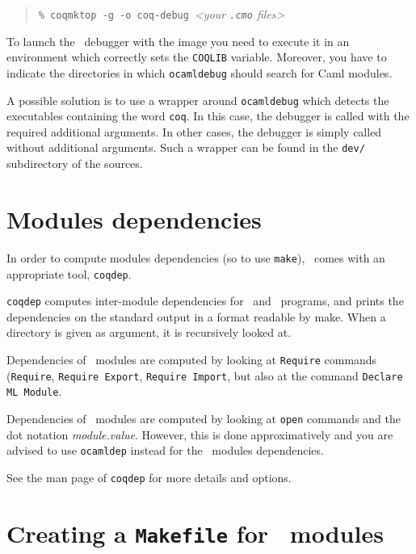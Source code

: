\begin{quotation}
\texttt{\% coqmktop -g -o coq-debug}~\emph{<your \texttt{.cmo} files>}
\end{quotation}


To launch the \ocaml\ debugger with the image you need to execute it in
an environment which correctly sets the \texttt{COQLIB} variable.
Moreover, you have to indicate the directories in which
\texttt{ocamldebug} should search for Caml modules.

A possible solution is to use a wrapper around \texttt{ocamldebug}
which detects the executables containing the word \texttt{coq}. In
this case, the debugger is called with the required additional
arguments. In other cases, the debugger is simply called without additional
arguments. Such a wrapper can be found in the \texttt{dev/}
subdirectory of the sources. 

\section[Modules dependencies]{Modules dependencies\label{Dependencies}
  }

In order to compute modules dependencies (so to use {\tt make}),
\Coq\ comes with an appropriate tool, {\tt coqdep}.

{\tt coqdep} computes inter-module dependencies for \Coq\ and
\ocaml\ programs, and prints the dependencies on the standard
output in a format readable by make.  When a directory is given as
argument, it is recursively looked at.

Dependencies of \Coq\ modules are computed by looking at {\tt Require}
commands ({\tt Require}, {\tt Requi\-re Export}, {\tt Require Import},
but also at the command {\tt Declare ML Module}.

Dependencies of \ocaml\ modules are computed by looking at
\verb!open! commands and the dot notation {\em module.value}. However,
this is done approximatively and you are advised to use {\tt ocamldep}
instead for the \ocaml\ modules dependencies.

See the man page of {\tt coqdep} for more details and options.


\section[Creating a {\tt Makefile} for \Coq\ modules]{Creating a {\tt Makefile} for \Coq\ modules\label{Makefile}
}

